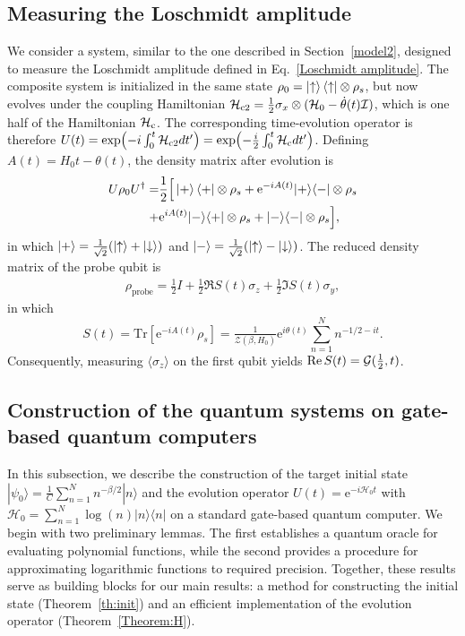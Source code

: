 \documentclass[aps,pra,twocolumn,superscriptaddress,preprintnumbers,amsmath,amssymb]{revtex4-2}
\begin{document}
\subsection{Measuring the Loschmidt amplitude}\label{Methods:Measure LA}
We consider a system, similar to the one described in Section~\ref{model2},  designed to measure the Loschmidt amplitude defined in Eq.~\eqref{Loschmidt amplitude}. The composite system is initialized in the same state $\rho_0 = \ket{\uparrow}\bra{\uparrow} \otimes \rho_s$, but now evolves  under the coupling Hamiltonian
$\mathcal{H}_{\rm c2} =\tfrac{1}{2} \sigma_x \otimes (\mathcal{H}_0-\dot{\theta}(t)\mathcal{I})$, which is  one half of the Hamiltonian $\mathcal{H}_{\rm c}$. The corresponding time-evolution operator is therefore $U(t) = \exp(-i\int_{0}^{t}\mathcal{H}_{\rm c2} dt')=\exp(-\tfrac{i}{2}\int_{0}^{t}\mathcal{H}_{\rm c} dt' )$. Defining $A(t) = H_0 t - \theta(t)$,  the  density matrix after evolution is
\begin{align}
    U \rho_0 U^\dagger = &\frac{1}{2} \Big[ \ket{+}\bra{+} \otimes \rho_s + \mathrm{e}^{-iA(t)} |+\rangle \langle -| \otimes \rho_s \notag\\
    +& \mathrm{e}^{iA(t)} |-\rangle \langle +| \otimes \rho_s + |-\rangle \langle -| \otimes \rho_s \Big],
\end{align}
in which $|+\rangle = \tfrac{1}{\sqrt{2}} (\ket{\uparrow} + \ket{\downarrow}) $ and $ |-\rangle=\tfrac{1}{\sqrt{2}} (\ket{\uparrow} - \ket{\downarrow})$. The reduced density matrix of the probe qubit is
\begin{align}
\rho_{\mathrm{probe}}=\frac{1}{2} I+\frac{1}{2}\Re S(t) \sigma_z+\frac{1}{2}\Im S(t) \sigma_y,
\end{align}
in which
\begin{equation}
    S(t) = \mathrm{Tr}[\mathrm{e}^{-iA(t)} \rho_s] 
= \tfrac{1}{\mathcal{Z}(\beta,H_0)} \mathrm{e}^{i\theta(t)} \textstyle\sum\limits_{n=1}^{N} n^{-1/2 - i t}.
\end{equation}
Consequently, measuring $\langle\sigma_z\rangle$ on the first qubit yields $\Re S(t)={\cal G}(\tfrac{1}{2},t)$.

\subsection{Construction of the quantum systems on  gate-based quantum computers}\label{Methods:Construction}
In this subsection, we describe the construction of the target initial state $|\psi_0\rangle=\tfrac{1}{C}\textstyle\sum_{n=1}^{N}n^{-\beta/2}|n\rangle$ and the evolution operator $U(t)=\mathrm{e}^{-i\mathcal{H}_0t}$ with $\mathcal{H}_0=\textstyle\sum_{n=1}^{N} \log(n)|n\rangle\langle n|$ on a standard gate-based quantum computer. We begin with two preliminary lemmas. The first establishes a quantum oracle for evaluating polynomial functions, while the second provides a procedure for approximating  logarithmic functions to required precision. Together, these results serve as building blocks for our main results: a  method for constructing the initial state (Theorem~\ref{th:init}) and an efficient implementation of the evolution operator (Theorem~\ref{Theorem:H}).\par
\end{document}

